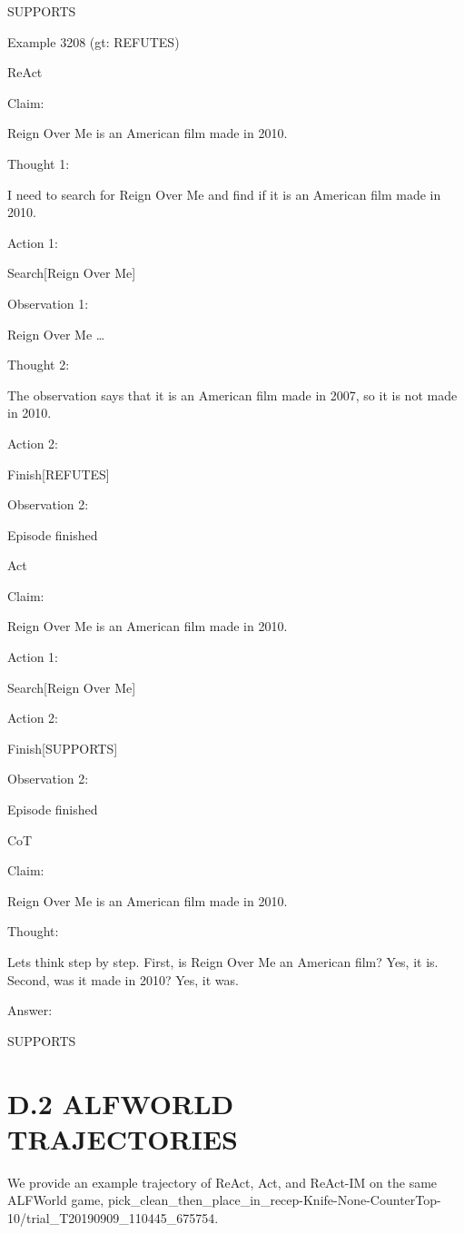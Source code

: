 \documentclass[
]{article}
\begin{document}
SUPPORTS

Example 3208 (gt: REFUTES)

ReAct

Claim:

Reign Over Me is an American film made in 2010.

Thought 1:

I need to search for Reign Over Me and find if it is an American film
made in 2010.

Action 1:

Search{[}Reign Over Me{]}

Observation 1:

Reign Over Me \ldots{}

Thought 2:

The observation says that it is an American film made in 2007, so it is
not made in 2010.

Action 2:

Finish{[}REFUTES{]}

Observation 2:

Episode finished

Act

Claim:

Reign Over Me is an American film made in 2010.

Action 1:

Search{[}Reign Over Me{]}

Action 2:

Finish{[}SUPPORTS{]}

Observation 2:

Episode finished

CoT

Claim:

Reign Over Me is an American film made in 2010.

Thought:

Let\textquotesingle s think step by step. First, is Reign Over Me an
American film? Yes, it is. Second, was it made in 2010? Yes, it was.

Answer:

SUPPORTS

\section{D.2 ALFWORLD TRAJECTORIES}\label{d.2-alfworld-trajectories}

We provide an example trajectory of ReAct, Act, and ReAct-IM on the same
ALFWorld game,
pick\_clean\_then\_place\_in\_recep-Knife-None-CounterTop-10/trial\_T20190909\_110445\_675754.
\end{document}
